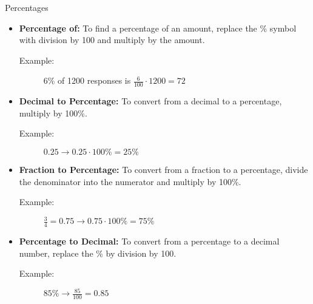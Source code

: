\documentclass{beamer}
\begin{document}
\begin{frame}
\begin{block}{Percentages}
\begin{itemize}
\item \textbf{Percentage of:} To find a percentage of an amount, replace the \% symbol with division by 100 and multiply by the amount.
\begin{description}
\item[Example:] 6\% of 1200 responses is $\frac{6}{100}\cdot 1200=72$
\end{description}
\item \textbf{Decimal to Percentage:} To convert from a decimal to a percentage, multiply by 100\%.
\begin{description}
\item[Example:] $0.25\rightarrow 0.25\cdot100\%=25\%$
\end{description}
\item \textbf{Fraction to Percentage:} To convert from a fraction to a percentage, divide the denominator into the numerator and multiply by 100\%.
\begin{description}
\item[Example:] $\frac{3}{4}=0.75\rightarrow 0.75\cdot 100\%=75\%$
\end{description}
\item \textbf{Percentage to Decimal:} To convert from a percentage to a decimal number, replace the \% by division by 100. 
\begin{description}
\item[Example:] $85\%\rightarrow \frac{85}{100}=0.85$
\end{description}
\end{itemize}
\end{block}
\end{frame}
\end{document}

